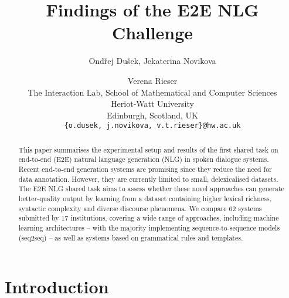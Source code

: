 \documentclass[11pt,a4paper]{article}
\title{Findings of the E2E NLG Challenge}
\author{Ondřej Dušek, Jekaterina Novikova \and Verena Rieser \\
  The Interaction Lab, School of Mathematical and Computer Sciences \\
  Heriot-Watt University \\
  Edinburgh, Scotland, UK \\
  {\tt \{o.dusek, j.novikova, v.t.rieser\}@hw.ac.uk} \\}
\date{}
\begin{document}
\maketitle
\begin{abstract}This paper summarises the experimental setup and results of the first shared task on end-to-end (E2E) natural language generation (NLG) in spoken dialogue systems. Recent end-to-end generation systems are promising since they reduce the need for data annotation. However, they are currently limited to small, delexicalised datasets. The E2E NLG shared task aims to assess whether these novel approaches can generate better-quality output by learning from a dataset containing higher lexical richness, syntactic complexity and diverse discourse phenomena. 
We compare 62 systems submitted by 17 institutions, covering a wide range of approaches, including machine learning architectures -- with the majority implementing sequence-to-sequence models (seq2seq) --
as well as systems based on grammatical rules and templates.
\end{abstract}

\section{Introduction}
\end{document}
